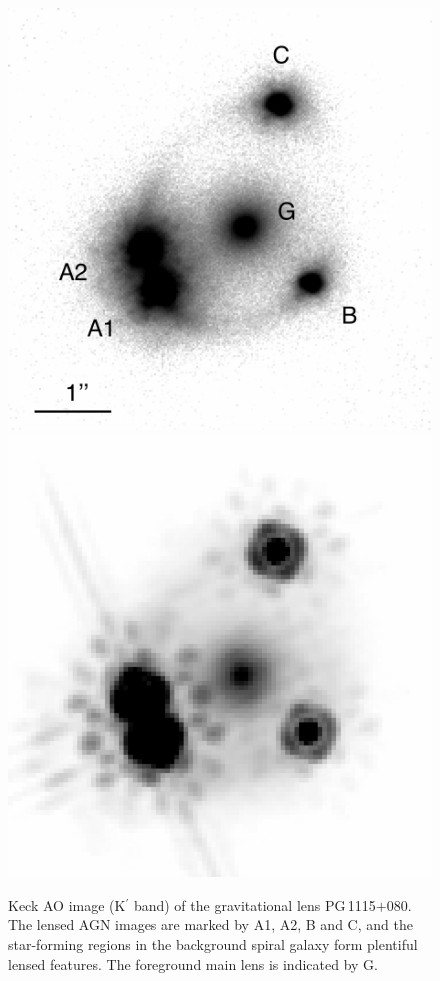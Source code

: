 \documentclass[useAMS,usenatbib]{mnras}
\newcommand\pg{PG\,1115$+$080}
\begin{document}
\begin{figure}
\includegraphics*[scale=0.5]{PG1115_AOnew.png}
\includegraphics*[scale=0.61]{PG1115_HSTnew.png}
\caption{Keck AO image (K$^\prime$ band) of the gravitational lens \pg. The lensed AGN images are marked by A1, A2, B and C, and the star-forming regions in the background spiral galaxy form plentiful lensed features. The foreground main lens is indicated by G.}
\label{fig:PG1115image}
\end{figure}
\end{document}
